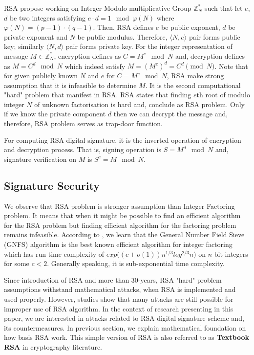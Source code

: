 \documentclass[10pt,sigconf]{acmart}
\newcommand{\Z}{\mathbb{Z}}
\begin{document}
RSA propose working on Integer Modulo multiplicative Group $\Z^{*}_{N}$ such that let $e$, $d$ be two integers satisfying $e \cdot d = 1 \mod \varphi(N)$ where $\varphi(N) = (p - 1) \cdot (q - 1)$. Then, RSA defines $e$ be public exponent, $d$ be private exponent and $N$ be public modulus. Therefore, $\langle N, e \rangle$ pair forms public key; similarly $\langle N, d \rangle$ pair forms private key. For the integer representation of message $M \in \Z^{*}_{N}$, encryption defines as $C = M^e \mod N$ and, decryption defines as $M = C^d \mod N$ which indeed satisfy $M = (M^e)^{d} = C^d \pmod N$. Note that for given publicly known $N$ and $e$ for $C = M^e \mod N$, RSA make strong assumption that it is infeasible to determine $M$. It is the second computational "hard" problem that manifest in RSA. RSA states that finding $e$th root of modulo integer $N$ of unknown factorisation is hard and, conclude as RSA problem. Only if we know the private component $d$ then we can decrypt the message and, therefore, RSA problem serves as trap-door function.

For computing RSA digital signature, it is the inverted operation of encryption and decryption process. That is, signing operation is $S = M^d \mod N$ and, signature verification on $M$ is $S^e = M \mod N$. 

\subsection{Signature Security}

We observe that RSA problem is stronger assumption than Integer Factoring problem. It means that when it might be possible to find an efficient algorithm for the RSA problem but finding efficient algorithm for the factoring problem remains infeasible. According to \cite{case2003beginner}, we learn that the General Number Field Sieve (GNFS) algorithm is the best known efficient algorithm for integer factoring which has run time complexity of $exp\big((c + o(1)) n^{1/3} log^{2/3}n\big)$ on $n$-bit integers for some $c < 2$. Generally speaking, it is sub-exponential time complexity.

Since introduction of RSA and more than 30-years, RSA "hard" problem assumptions withstand mathematical attacks, when RSA is implemented and used properly. However, studies \cite{boneh1999twenty} \cite{coppersmith1997small} \cite{coron2000new} show that many attacks are still possible for improper use of RSA algorithm. In the context of research presenting in this paper, we are interested in attacks related to RSA digital signature scheme and, its countermeasures. In previous section, we explain mathematical foundation on how basis RSA work. This simple version of RSA is also referred to as \textbf{Textbook RSA} in cryptography literature. 
\end{document}
